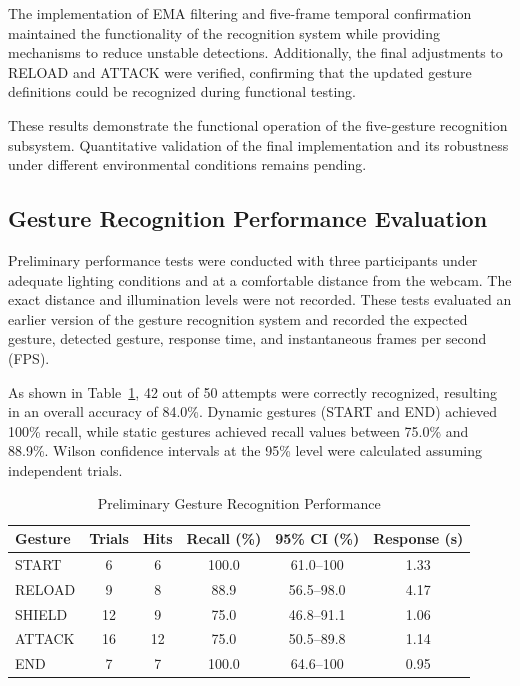 \documentclass[lettersize,journal]{IEEEtran}
\begin{document}
	The implementation of EMA filtering and five-frame temporal confirmation maintained the functionality of the recognition system while providing mechanisms to reduce unstable detections. Additionally, the final adjustments to RELOAD and ATTACK were verified, confirming that the updated gesture definitions could be recognized during functional testing.
	
	These results demonstrate the functional operation of the five-gesture recognition subsystem. Quantitative validation of the final implementation and its robustness under different environmental conditions remains pending.

	\subsection{Gesture Recognition Performance Evaluation}

	Preliminary performance tests
	were conducted with three participants under adequate lighting
	conditions and at a comfortable distance from the webcam.
	The exact distance and illumination levels were not recorded.
	These tests evaluated an earlier version of the gesture
	recognition system and recorded the expected gesture, detected
	gesture, response time, and instantaneous frames per second
	(FPS).

	As shown in
	Table~\ref{tab:gesture_benchmark}, 42 out of 50 attempts were
	correctly recognized, resulting in an overall accuracy of
	84.0\%. Dynamic gestures (START and END) achieved 100\%
	recall, while static gestures achieved recall values between
	75.0\% and 88.9\%. Wilson confidence intervals at the 95\%
	level were calculated assuming independent trials.

	\begin{table}[!t]
		\centering
		\caption{Preliminary Gesture Recognition Performance}
		\label{tab:gesture_benchmark}
		\scriptsize
		\setlength{\tabcolsep}{3pt}
		\renewcommand{\arraystretch}{1.1}
		\begin{tabular}{@{}l c c c c c@{}}
			\toprule
			\textbf{Gesture} &
			\textbf{Trials} &
			\textbf{Hits} &
			\textbf{Recall (\%)} &
			\textbf{95\% CI (\%)} &
			\textbf{Response (s)} \\
			\midrule
			START  & 6  & 6  & 100.0 & 61.0--100 & 1.33 \\
			RELOAD & 9  & 8  & 88.9  & 56.5--98.0 & 4.17 \\
			SHIELD & 12 & 9  & 75.0  & 46.8--91.1 & 1.06 \\
			ATTACK & 16 & 12 & 75.0  & 50.5--89.8 & 1.14 \\
			END    & 7  & 7  & 100.0 & 64.6--100 & 0.95 \\
			\bottomrule
		\end{tabular}
	\end{table}
\end{document}
